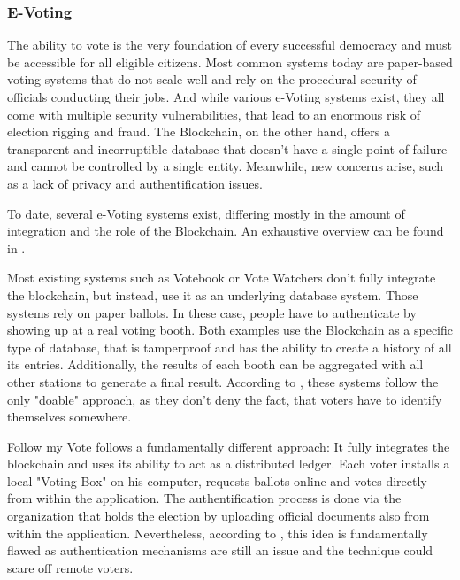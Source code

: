 \subsubsection{E-Voting}
\label{subsec:03_applications_evoting}
The ability to vote is the very foundation of every successful democracy and must be accessible for all eligible citizens. Most common systems today are paper-based voting systems that do not scale well and rely on the procedural security of officials conducting their jobs. And while various e-Voting systems exist, they all come with multiple security vulnerabilities, that lead to an enormous risk of election rigging and fraud.
The Blockchain, on the other hand, offers a transparent and incorruptible database that doesn't have a single point of failure and cannot be controlled by a single entity. Meanwhile, new concerns arise, such as a lack of privacy and authentification issues.

To date, several e-Voting systems exist, differing mostly in the amount of integration and the role of the Blockchain. An exhaustive overview can be found in  \cite{BenAyed2017}.

Most existing systems such as Votebook \cite{Kirby2016} or Vote Watchers \cite{BlockchainTechnologiesCorporation} don't fully integrate the blockchain, but instead, use it as an underlying database system. Those systems rely on paper ballots. In these case, people have to authenticate by showing up at a real voting booth. Both examples use the Blockchain as a specific type of database, that is tamperproof and has the ability to create a history of all its entries. Additionally, the results of each booth can be aggregated with all other stations to generate a final result\cite{BenAyed2017}.
According to \cite{Osgood2016}, these systems follow the only "doable" approach, as they don't deny the fact, that voters have to identify themselves somewhere.

Follow my Vote \cite{FollowMyVote} follows a fundamentally different approach: It fully integrates the blockchain and uses its ability to act as a distributed ledger. Each voter installs a local "Voting Box" on his computer, requests ballots online and votes directly from within the application. The authentification process is done via the organization that holds the election by uploading official documents also from within the application. Nevertheless, according to \cite{Osgood2016}, this idea is fundamentally flawed as authentication mechanisms are still an issue and the technique could scare off remote voters.

